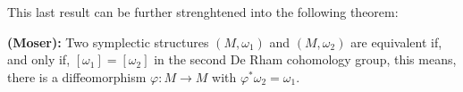 This last result can be further strenghtened into the following theorem:

\begin{theo}
{\bf (Moser):} Two symplectic structures $(M,\omega_1)$ and $(M,\omega_2)$ are equivalent if, and only if, $[\omega_1] = [\omega_2]$ in the second De Rham cohomology group, this means, there is a diffeomorphism $\varphi : M \rightarrow M$ with $\varphi^{\ast}\omega_2 = \omega_1$.
\end{theo}
